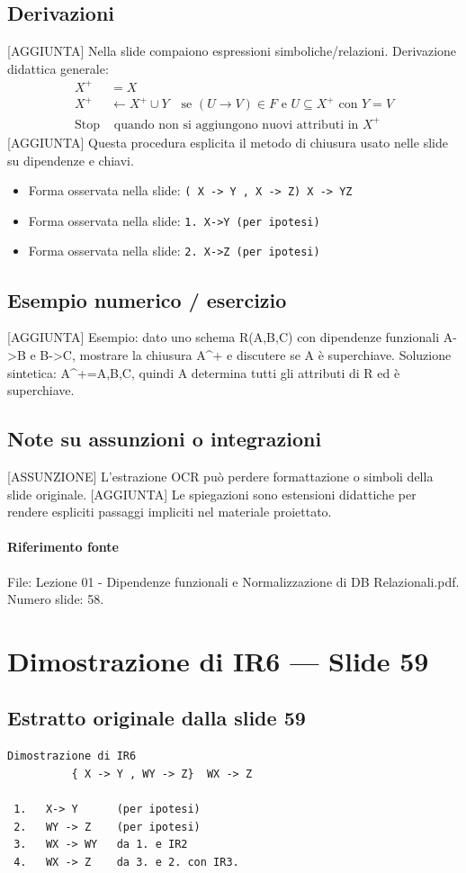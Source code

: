 \documentclass[11pt]{article}
\begin{document}
\subsection*{Derivazioni}
[AGGIUNTA] Nella slide compaiono espressioni simboliche/relazioni. Derivazione didattica generale:
\begin{align*}
X^+ &= X \\
X^+ &\leftarrow X^+ \cup Y \quad \text{se } (U \to V) \in F \text{ e } U \subseteq X^+ \text{ con } Y=V \\
\text{Stop} &\text{ quando non si aggiungono nuovi attributi in } X^+
\end{align*}
[AGGIUNTA] Questa procedura esplicita il metodo di chiusura usato nelle slide su dipendenze e chiavi.
\begin{itemize}[leftmargin=*]
\item Forma osservata nella slide: \texttt{( X -> Y , X -> Z)  X -> YZ}
\item Forma osservata nella slide: \texttt{1.   X->Y          (per ipotesi)}
\item Forma osservata nella slide: \texttt{2.   X->Z          (per ipotesi)}
\end{itemize}
\subsection*{Esempio numerico / esercizio}
[AGGIUNTA] Esempio: dato uno schema R(A,B,C) con dipendenze funzionali A->B e B->C, mostrare la chiusura A^+ e discutere se A è superchiave. Soluzione sintetica: A^+={A,B,C}, quindi A determina tutti gli attributi di R ed è superchiave.
\subsection*{Note su assunzioni o integrazioni}
[ASSUNZIONE] L'estrazione OCR può perdere formattazione o simboli della slide originale.
[AGGIUNTA] Le spiegazioni sono estensioni didattiche per rendere espliciti passaggi impliciti nel materiale proiettato.
\paragraph{Riferimento fonte} File: Lezione 01 - Dipendenze funzionali e Normalizzazione di DB Relazionali.pdf. Numero slide: 58.
\section{Dimostrazione di IR6 --- Slide 59}
\subsection*{Estratto originale dalla slide 59}
\begin{lstlisting}
Dimostrazione di IR6
          { X -> Y , WY -> Z}  WX -> Z

 1.   X-> Y      (per ipotesi)
 2.   WY -> Z    (per ipotesi)
 3.   WX -> WY   da 1. e IR2
 4.   WX -> Z    da 3. e 2. con IR3.
\end{lstlisting}
\end{document}
